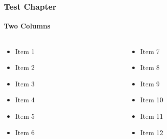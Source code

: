 
\begin{frame}
	\frametitle{Test Chapter}
	\framesubtitle{Two Columns}

	\begin{columns}[T]

		\begin{column}{.5\textwidth}
			\begin{itemize}
				\item Item 1
				\item Item 2
				\item Item 3
				\item Item 4
				\item Item 5
				\item Item 6
			\end{itemize}
		\end{column}

		\begin{column}{.5\textwidth}
			\begin{itemize}
				\item Item 7
				\item Item 8
				\item Item 9
				\item Item 10
				\item Item 11
				\item Item 12
			\end{itemize}
		\end{column}

	\end{columns}

\end{frame}


